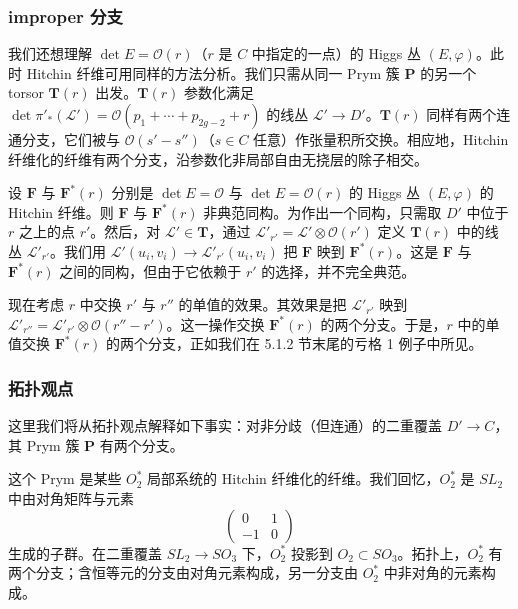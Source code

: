 \subsubsection{improper 分支}

我们还想理解 $\det E = \mathcal{O}(r)$（$r$ 是 $C$ 中指定的一点）的 Higgs 丛 $(E,\varphi)$。此时 Hitchin 纤维可用同样的方法分析。我们只需从同一 Prym 簇 $\boldsymbol{P}$ 的另一个 torsor $\boldsymbol{T}(r)$ 出发。$\boldsymbol{T}(r)$ 参数化满足 $\det\pi'_*(\mathcal{L}') = \mathcal{O}(p_1+\cdots+p_{2g-2}+r)$ 的线丛 $\mathcal{L}'\to D'$。$\boldsymbol{T}(r)$ 同样有两个连通分支，它们被与 $\mathcal{O}(s'-s'')$（$s\in C$ 任意）作张量积所交换。相应地，Hitchin 纤维化的纤维有两个分支，沿参数化非局部自由无挠层的除子相交。

设 $\boldsymbol{F}$ 与 $\boldsymbol{F}^*(r)$ 分别是 $\det E = \mathcal{O}$ 与 $\det E = \mathcal{O}(r)$ 的 Higgs 丛 $(E,\varphi)$ 的 Hitchin 纤维。则 $\boldsymbol{F}$ 与 $\boldsymbol{F}^*(r)$ 非典范同构。为作出一个同构，只需取 $D'$ 中位于 $r$ 之上的点 $r'$。然后，对 $\mathcal{L}'\in\boldsymbol{T}$，通过 $\mathcal{L}'_{r'} = \mathcal{L}'\otimes\mathcal{O}(r')$ 定义 $\boldsymbol{T}(r)$ 中的线丛 $\mathcal{L}'_{r'}$。我们用 $\mathcal{L}'(u_i,v_i)\to\mathcal{L}'_{r'}(u_i,v_i)$ 把 $\boldsymbol{F}$ 映到 $\boldsymbol{F}^*(r)$。这是 $\boldsymbol{F}$ 与 $\boldsymbol{F}^*(r)$ 之间的同构，但由于它依赖于 $r'$ 的选择，并不完全典范。

现在考虑 $r$ 中交换 $r'$ 与 $r''$ 的单值的效果。其效果是把 $\mathcal{L}'_{r'}$ 映到 $\mathcal{L}'_{r''} = \mathcal{L}'_{r'}\otimes\mathcal{O}(r''-r')$。这一操作交换 $\boldsymbol{F}^*(r)$ 的两个分支。于是，$r$ 中的单值交换 $\boldsymbol{F}^*(r)$ 的两个分支，正如我们在 5.1.2 节末尾的亏格 1 例子中所见。

\subsubsection{拓扑观点}

这里我们将从拓扑观点解释如下事实：对非分歧（但连通）的二重覆盖 $D'\to C$，其 Prym 簇 $\boldsymbol{P}$ 有两个分支。

这个 Prym 是某些 $O_2^*$ 局部系统的 Hitchin 纤维化的纤维。我们回忆，$O_2^*$ 是 $SL_2$ 中由对角矩阵与元素
\begin{equation}\tag{5.14}
\begin{pmatrix}
0 & 1\\
-1 & 0
\end{pmatrix}
\end{equation}
生成的子群。在二重覆盖 $SL_2\to SO_3$ 下，$O_2^*$ 投影到 $O_2\subset SO_3$。拓扑上，$O_2^*$ 有两个分支；含恒等元的分支由对角元素构成，另一分支由 $O_2^*$ 中非对角的元素构成。

